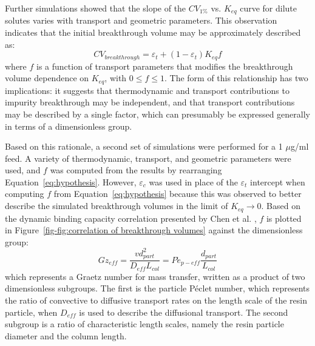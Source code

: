 \documentclass[preprint,review,12pt]{elsarticle}
\begin{document}
        Further simulations showed that the slope of the $CV_{1\%}$ vs. $K_{eq}$ curve for dilute solutes varies with transport and geometric parameters. This observation indicates that the initial breakthrough volume may be approximately described as:
        \begin{equation} \label{eq:hypothesis}
            CV_{breakthrough} = \varepsilon_t + (1 - \varepsilon_t) K_{eq} f
        \end{equation}
        where $f$ is a function of transport parameters that modifies the breakthrough volume dependence on $K_{eq}$, with $0 \leq f \leq 1$. The form of this relationship has two implications:  it suggests that thermodynamic and transport contributions to impurity breakthrough may be independent, and that transport contributions may be described by a single factor, which can presumably be expressed generally in terms of a dimensionless group.


        
        Based on this rationale, a second set of simulations were performed for a 1 $\mu$g/ml feed. A variety of thermodynamic, transport, and geometric parameters were used, and $f$ was computed from the results by rearranging Equation~\ref{eq:hypothesis}. However, $\varepsilon_c$ was used in place of the $\varepsilon_t$ intercept when computing $f$ from Equation~\ref{eq:hypothesis} because this was observed to better describe the simulated breakthrough volumes in the limit of $K_{eq} \to 0$. Based on the dynamic binding capacity correlation presented by Chen et al. \cite{Chen2020}, $f$ is plotted in Figure~\ref{fig-fig:correlation of breakthrough volumes} against the dimensionless group:
        \begin{equation} \label{eq:dimensionless group}
            Gz_{eff} = \frac{v d_{part}^2}{D_{eff} L_{col}} = P\acute{e}_{p - eff} \frac{d_{part}}{L_{col}}
        \end{equation}
        which represents a Graetz number for mass transfer, written as a product of two dimensionless subgroups. The first is the particle P\'eclet number, which represents the ratio of convective to diffusive transport rates on the length scale of the resin particle, when $D_{eff}$ is used to describe the diffusional transport. The second subgroup is a ratio of characteristic length scales, namely the resin particle diameter and the column length.
\end{document}

